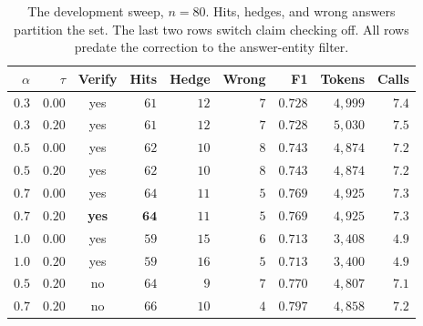 \begin{table}[!t]
\caption{The development sweep, $n = 80$. Hits, hedges, and wrong answers
  partition the set. The last two rows switch claim checking off. All rows
  predate the correction to the answer-entity filter.}
\label{tab:sweep}
\centering
\small
\setlength{\tabcolsep}{3.5pt}
\begin{tabular}{@{}rrcrrrrrr@{}}
\toprule
$\alpha$ & $\tau$ & Verify & Hits & Hedge & Wrong & F1 & Tokens & Calls \\
\midrule
$0.3$ & $0.00$ & yes & $61$ & $12$ & $7$ & $0.728$ & $4{,}999$ & $7.4$ \\
$0.3$ & $0.20$ & yes & $61$ & $12$ & $7$ & $0.728$ & $5{,}030$ & $7.5$ \\
$0.5$ & $0.00$ & yes & $62$ & $10$ & $8$ & $0.743$ & $4{,}874$ & $7.2$ \\
$0.5$ & $0.20$ & yes & $62$ & $10$ & $8$ & $0.743$ & $4{,}874$ & $7.2$ \\
$0.7$ & $0.00$ & yes & $64$ & $11$ & $5$ & $0.769$ & $4{,}925$ & $7.3$ \\
$\mathbf{0.7}$ & $\mathbf{0.20}$ & \textbf{yes} & $\mathbf{64}$ & $11$ & $5$ & $0.769$ & $4{,}925$ & $7.3$ \\
$1.0$ & $0.00$ & yes & $59$ & $15$ & $6$ & $0.713$ & $3{,}408$ & $4.9$ \\
$1.0$ & $0.20$ & yes & $59$ & $16$ & $5$ & $0.713$ & $3{,}400$ & $4.9$ \\
\midrule
$0.5$ & $0.20$ & no & $64$ & $9$ & $7$ & $0.770$ & $4{,}807$ & $7.1$ \\
$0.7$ & $0.20$ & no & $66$ & $10$ & $4$ & $0.797$ & $4{,}858$ & $7.2$ \\
\bottomrule
\end{tabular}
\end{table}

\endinput
